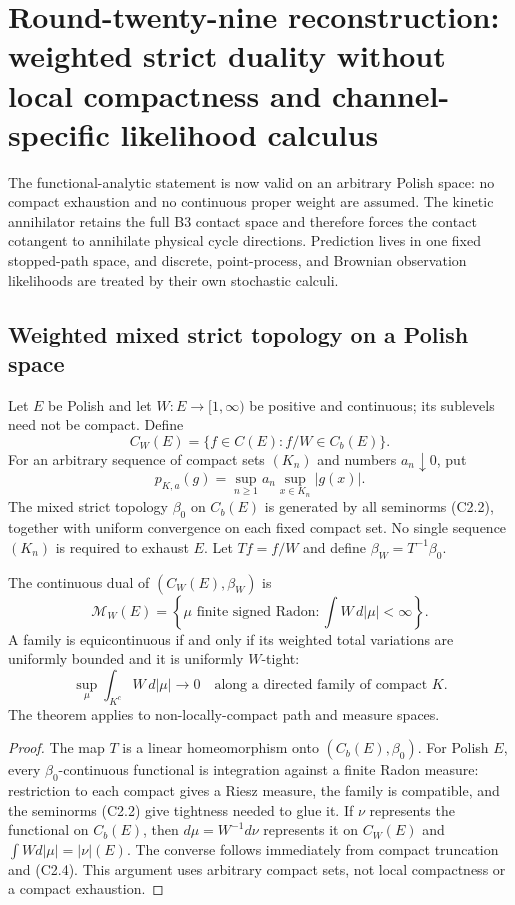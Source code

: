 \section{Round-twenty-nine reconstruction: weighted strict duality without local compactness and channel-specific likelihood calculus}
\label{sec:r29-c2}

The functional-analytic statement is now valid on an arbitrary Polish space:
no compact exhaustion and no continuous proper weight are assumed.  The
kinetic annihilator retains the full B3 contact space and therefore forces the
contact cotangent to annihilate physical cycle directions.  Prediction lives
in one fixed stopped-path space, and discrete, point-process, and Brownian
observation likelihoods are treated by their own stochastic calculi.

\subsection{Weighted mixed strict topology on a Polish space}

Let $E$ be Polish and let $W:E\to[1,\infty)$ be positive and continuous; its
sublevels need not be compact.  Define
\[
 C_W(E)=\{f\in C(E):f/W\in C_b(E)\}.                      \tag{C2.1}
\]
For an arbitrary sequence of compact sets $(K_n)$ and numbers
$a_n\downarrow0$, put
\[
 p_{K,a}(g)=\sup_{n\ge1}a_n\sup_{x\in K_n}|g(x)|.          \tag{C2.2}
\]
The mixed strict topology $\beta_0$ on $C_b(E)$ is generated by all seminorms
(C2.2), together with uniform convergence on each fixed compact set.  No
single sequence $(K_n)$ is required to exhaust $E$.  Let
$Tf=f/W$ and define $\beta_W=T^{-1}\beta_0$.

\begin{theorem}
\label{thm:r29-c2-dual}
The continuous dual of $(C_W(E),\beta_W)$ is
\[
 \mathcal M_W(E)=\left\{\mu\text{ finite signed Radon}:
                         \int W\,d|\mu|<\infty\right\}.    \tag{C2.3}
\]
A family is equicontinuous if and only if its weighted total variations are
uniformly bounded and it is uniformly $W$-tight:
\[
 \sup_{\mu}\int_{K^c}W\,d|\mu|\longrightarrow0
 \quad\text{along a directed family of compact }K.        \tag{C2.4}
\]
The theorem applies to non-locally-compact path and measure spaces.
\end{theorem}

\begin{proof}
The map $T$ is a linear homeomorphism onto $(C_b(E),\beta_0)$.  For Polish
$E$, every $\beta_0$-continuous functional is integration against a finite
Radon measure: restriction to each compact gives a Riesz measure, the family
is compatible, and the seminorms (C2.2) give tightness needed to glue it.  If
$\nu$ represents the functional on $C_b(E)$, then
$d\mu=W^{-1}d\nu$ represents it on $C_W(E)$ and
$\int Wd|\mu|=|\nu|(E)$.  The converse follows immediately from compact
truncation and (C2.4).  This argument uses arbitrary compact sets, not local
compactness or a compact exhaustion.
\end{proof}

